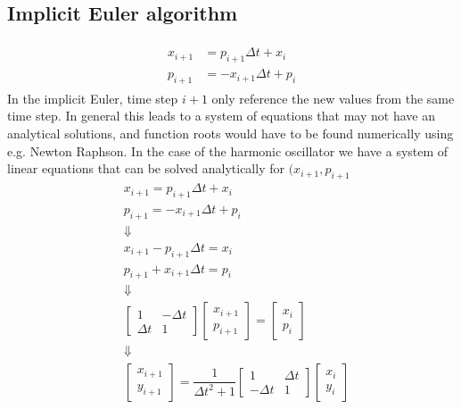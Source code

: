 \subsection{Implicit Euler algorithm}
\begin{align}
\begin{split}
x_{i+1} &= p_{i+1}\Delta t + x_i \\
p_{i+1} &= -x_{i+1}\Delta t + p_i
\end{split}
\end{align}
In the implicit Euler, time step $i+1$ only reference the new values from the same time step. In general this leads to a system of equations that may not have an analytical solutions, and function roots would have to be found numerically using e.g. Newton Raphson. In the case of the harmonic oscillator we have a system of linear equations that can be solved analytically for $(x_{i+1},p_{i+1}$
\begin{align}
\nonumber &x_{i+1} = p_{i+1}\Delta t + x_i \\
\nonumber &p_{i+1} = -x_{i+1}\Delta t + p_i \\[0.4cm]
\nonumber & \Downarrow \\[0.4cm]
\nonumber &x_{i+1} - p_{i+1}\Delta t = x_i \\
\nonumber &p_{i+1} + x_{i+1}\Delta t = p_i \\[0.4cm]
\nonumber &\Downarrow \\[0.4cm]
\nonumber &\begin{bmatrix}
  1 & -\Delta t \\
  \Delta t & 1
\end{bmatrix}
\begin{bmatrix}
  x_{i+1} \\
  p_{i+1}
\end{bmatrix}
= \begin{bmatrix}
  x_i \\
  p_i
\end{bmatrix} \\[0.4cm]
\nonumber &\Downarrow \\[0.4cm]
&\begin{bmatrix} \label{al:ho-euler_i}
  x_{i+1} \\
  y_{i+1}
\end{bmatrix}
= \dfrac{1}{{\Delta t}^2 + 1}
\begin{bmatrix}
  1 & \Delta t \\
  -\Delta t & 1
\end{bmatrix}
\begin{bmatrix}
  x_i \\
  y_i
\end{bmatrix}
\end{align}

